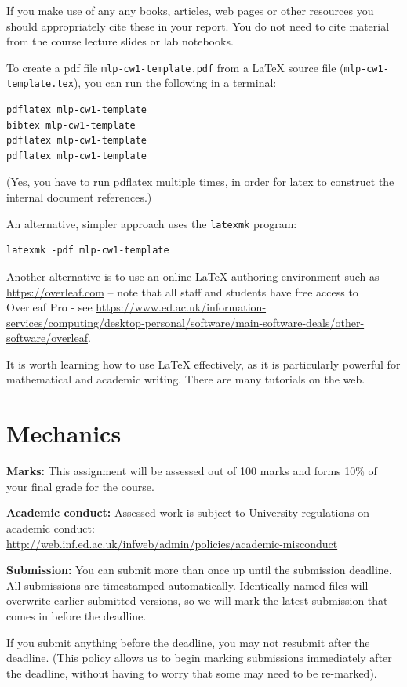 \documentclass[11pt,]{article}
\begin{document}
If you make use of any any books, articles, web pages or other resources you should appropriately cite these in your report. You do not need to cite material from the course lecture slides or lab notebooks.

To create a pdf file \verb+mlp-cw1-template.pdf+ from a LaTeX source file (\verb+mlp-cw1-template.tex+), you can run the following in a terminal:
\begin{verbatim}
pdflatex mlp-cw1-template
bibtex mlp-cw1-template
pdflatex mlp-cw1-template
pdflatex mlp-cw1-template
\end{verbatim}
(Yes, you have to run pdflatex multiple times, in order  for latex to construct the internal document references.)

An alternative, simpler approach uses the \verb+latexmk+ program:
\begin{verbatim}
latexmk -pdf mlp-cw1-template
\end{verbatim}

Another alternative is to use an online LaTeX authoring environment such as \url{https://overleaf.com} -- note that all staff and students have free access to Overleaf Pro - see \url{https://www.ed.ac.uk/information-services/computing/desktop-personal/software/main-software-deals/other-software/overleaf}.

It is worth learning how to use LaTeX effectively, as it is particularly powerful for mathematical and academic writing.  There are many tutorials on the web.


\section{Mechanics}
\label{sec:mechanics}

\textbf{Marks:} 
This assignment will be assessed out of 100 marks and forms 10\% of your final grade for the course.

\textbf{Academic conduct:} 
Assessed work is subject to University
regulations on academic
conduct:\\ {\small \url{http://web.inf.ed.ac.uk/infweb/admin/policies/academic-misconduct}}

\textbf{Submission:} 
You can submit more than once up until the submission deadline. All
submissions are timestamped automatically. Identically named files
will overwrite earlier submitted versions, so we will mark the latest
submission that comes in before the deadline.

If you submit anything before the deadline, you may not resubmit
after the deadline. (This policy allows us to begin marking submissions
immediately after the deadline, without having to worry that some may
need to be re-marked).
\end{document}
